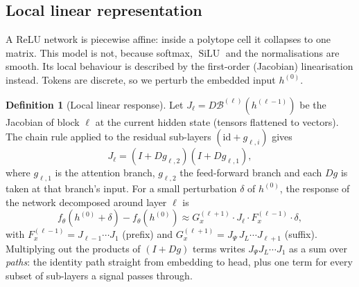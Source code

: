 \documentclass[10pt,a4paper]{article}
\newcommand{\op}[1]{\operatorname{#1}}
\theoremstyle{definition}
\newtheorem{definition}{Definition}[section]
\begin{document}
\subsection{Local linear representation}
A ReLU network is piecewise affine: inside a polytope cell it collapses to one matrix. This model is not, because softmax, $\op{SiLU}$ and the normalisations are smooth. Its local behaviour is described by the first-order (Jacobian) linearisation instead. Tokens are discrete, so we perturb the embedded input $h^{(0)}$.
\begin{definition}[Local linear response]
Let $J_\ell=D\mathcal{B}^{(\ell)}(h^{(\ell-1)})$ be the Jacobian of block $\ell$ at the current hidden state (tensors flattened to vectors). The chain rule applied to the residual sub-layers $(\mathrm{id}+g_{\ell,i})$ gives
\begin{equation}
  J_\ell = (I+Dg_{\ell,2})(I+Dg_{\ell,1}),
\end{equation}
where $g_{\ell,1}$ is the attention branch, $g_{\ell,2}$ the feed-forward branch and each $Dg$ is taken at that branch's input. For a small perturbation $\delta$ of $h^{(0)}$, the response of the network decomposed around layer $\ell$ is
\begin{equation}
  f_\theta(h^{(0)}+\delta)-f_\theta(h^{(0)}) \approx G^{(\ell+1)}_x\cdot J_\ell\cdot F^{(\ell-1)}_x\cdot\delta,
\end{equation}
with $F^{(\ell-1)}_x=J_{\ell-1}\cdots J_1$ (prefix) and $G^{(\ell+1)}_x=J_\Psi\,J_L\cdots J_{\ell+1}$ (suffix). Multiplying out the products of $(I+Dg)$ terms writes $J_\Psi J_L\cdots J_1$ as a sum over \emph{paths}: the identity path straight from embedding to head, plus one term for every subset of sub-layers a signal passes through.
\end{definition}
\end{document}
